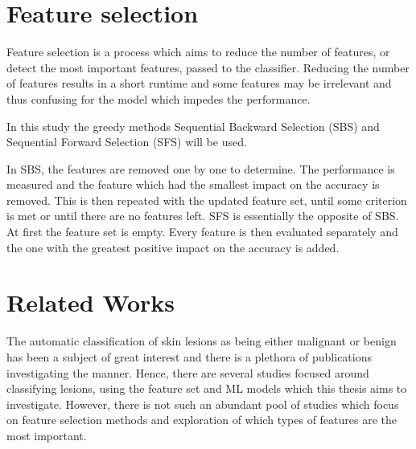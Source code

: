 \documentclass{kththesis}
\begin{document}
\section{Feature selection}


Feature selection is a process which aims to reduce the number of features, or detect the most important features, passed to the classifier. Reducing the number of features results in a short runtime and some features may be irrelevant and thus confusing for the model which impedes the performance.\parencite{chaganti2022thyroid}

In this study the greedy methods Sequential Backward Selection (SBS) and Sequential Forward Selection (SFS) will be used.

In SBS, the features are removed one by one to determine. The performance is measured and the feature which had the smallest impact on the accuracy is removed. This is then repeated with the updated feature set, until some criterion is met or until there are no features left.
SFS is essentially the opposite of SBS. At first the feature set is empty. Every feature is then evaluated separately and the one with the greatest positive impact on the accuracy is added. \parencite{chaganti2022thyroid}


\section{Related Works}



The automatic classification of skin lesions as being either malignant or benign has been a subject of great interest and there is a plethora of publications investigating the manner. Hence, there are several studies focused around classifying lesions, using the feature set and ML models which this thesis aims to investigate. However, there is not such an abundant pool of studies which focus on feature selection methods and exploration of which types of features are the most important. 
\end{document}
